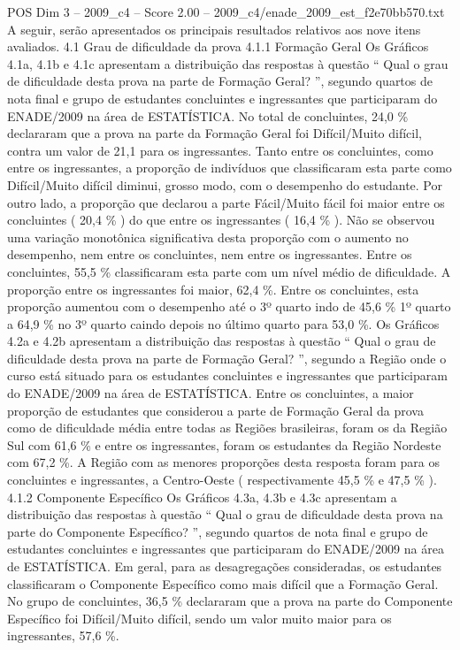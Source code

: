 \begin{textsample}{POS Dim 3 – 2009\_c4 – Score 2.00 – 2009\_c4/enade\_2009\_est\_f2e70bb570.txt}
A seguir, serão apresentados os principais resultados relativos aos nove itens avaliados. 4.1 Grau de dificuldade da prova 4.1.1 Formação Geral Os Gráficos 4.1a, 4.1b e 4.1c apresentam a distribuição das respostas à questão “ Qual o grau de dificuldade desta prova na parte de Formação Geral? ”, segundo quartos de nota final e grupo de estudantes concluintes e ingressantes que participaram do ENADE/2009 na área de ESTATÍSTICA.
No total de concluintes, 24,0 \% declararam que a prova na parte da Formação Geral foi Difícil/Muito difícil, contra um valor de 21,1 para os ingressantes.
Tanto entre os concluintes, como entre os ingressantes, a proporção de indivíduos que classificaram esta parte como Difícil/Muito difícil diminui, grosso modo, com o desempenho do estudante.
Por outro lado, a proporção que declarou a parte Fácil/Muito fácil foi maior entre os concluintes ( 20,4 \% ) do que entre os ingressantes ( 16,4 \% ).
Não se observou uma variação monotônica significativa desta proporção com o aumento no desempenho, nem entre os concluintes, nem entre os ingressantes.
Entre os concluintes, 55,5 \% classificaram esta parte com um nível médio de dificuldade.
A proporção entre os ingressantes foi maior, 62,4 \%.
Entre os concluintes, esta proporção aumentou com o desempenho até o 3º quarto indo de 45,6 \% 1º quarto a 64,9 \% no 3º quarto caindo depois no último quarto para 53,0 \%.
Os Gráficos 4.2a e 4.2b apresentam a distribuição das respostas à questão “ Qual o grau de dificuldade desta prova na parte de Formação Geral? ”, segundo a Região onde o curso está situado para os estudantes concluintes e ingressantes que participaram do ENADE/2009 na área de ESTATÍSTICA.
Entre os concluintes, a maior proporção de estudantes que considerou a parte de Formação Geral da prova como de dificuldade média entre todas as Regiões brasileiras, foram os da Região Sul com 61,6 \% e entre os ingressantes, foram os estudantes da Região Nordeste com 67,2 \%.
A Região com as menores proporções desta resposta foram para os concluintes e ingressantes, a Centro-Oeste ( respectivamente 45,5 \% e 47,5 \% ). 4.1.2 Componente Específico Os Gráficos 4.3a, 4.3b e 4.3c apresentam a distribuição das respostas à questão “ Qual o grau de dificuldade desta prova na parte do Componente Específico? ”, segundo quartos de nota final e grupo de estudantes concluintes e ingressantes que participaram do ENADE/2009 na área de ESTATÍSTICA.
Em geral, para as desagregações consideradas, os estudantes classificaram o Componente Específico como mais difícil que a Formação Geral.
No grupo de concluintes, 36,5 \% declararam que a prova na parte do Componente Específico foi Difícil/Muito difícil, sendo um valor muito maior para os ingressantes, 57,6 \%.

\end{textsample}
